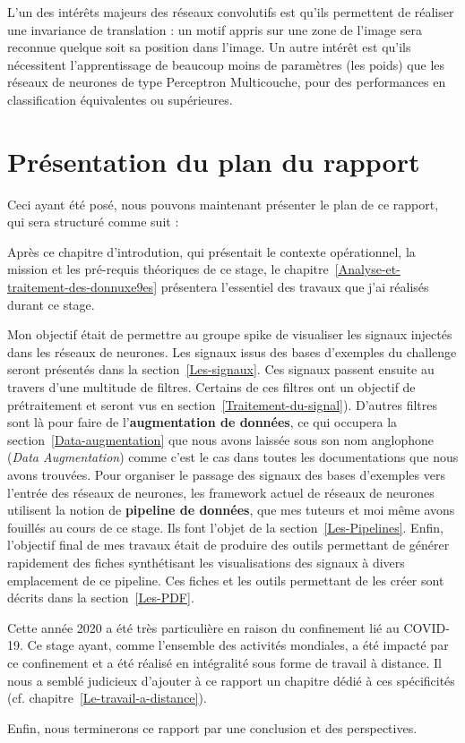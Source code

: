 L'un des intérêts majeurs des réseaux convolutifs est qu'ils permettent de
réaliser une invariance de translation :
un motif appris sur une zone de l'image sera reconnue quelque soit sa position
dans l'image.
Un autre intérêt est qu'ils nécessitent l'apprentissage de beaucoup moins de
paramètres (les poids) que les réseaux de neurones de type Perceptron
Multicouche, pour des performances en classification équivalentes ou
supérieures.

\hypertarget{plan}{%
\section{Présentation du plan du rapport}%
\label{Présentation du plan du rapport}}

Ceci ayant été posé, nous pouvons maintenant présenter le plan de ce rapport,
qui sera structuré comme suit :

Après ce chapitre d'introdution, qui présentait le contexte opérationnel, la mission et les pré-requis théoriques de ce stage, le
chapitre~\ref{Analyse-et-traitement-des-donnuxe9es} présentera l'essentiel
des travaux que j'ai réalisés durant ce stage.

Mon objectif était de permettre au groupe spike de visualiser les signaux
injectés dans les réseaux de neurones.
Les signaux issus des bases d'exemples du challenge seront présentés dans la section~\ref{Les-signaux}.
Ces signaux passent ensuite au travers d'une multitude de filtres.
Certains de ces filtres ont un objectif de prétraitement et seront vus en section~\ref{Traitement-du-signal}).
D'autres filtres sont là pour faire de l'\textbf{augmentation de données}, ce
qui occupera la section~\ref{Data-augmentation} que nous avons laissée sous son
nom anglophone (\textit{Data Augmentation}) comme c'est le cas dans toutes les documentations que nous avons
trouvées.
Pour organiser le passage des signaux des bases d'exemples vers l'entrée des réseaux de neurones, les framework actuel de réseaux de neurones utilisent
la notion de \textbf{pipeline de données}, que mes tuteurs et moi même avons
fouillés au cours de ce stage. Ils font l'objet de la
section~\ref{Les-Pipelines}.
Enfin, l'objectif final de mes travaux était de produire des outils permettant
de générer rapidement des fiches synthétisant les visualisations des signaux à divers emplacement de ce pipeline. Ces fiches et les outils permettant de les
créer sont décrits dans la section~\ref{Les-PDF}.

Cette année 2020 a été très particulière en raison du confinement lié au
COVID-19. Ce stage ayant, comme l'ensemble des activités mondiales, a été
impacté par ce confinement et a été réalisé en intégralité sous forme de
travail à distance. Il nous a semblé judicieux d'ajouter à ce rapport un
chapitre dédié à ces spécificités (cf. chapitre~\ref{Le-travail-a-distance}).

Enfin, nous terminerons ce rapport par une conclusion et des perspectives.
